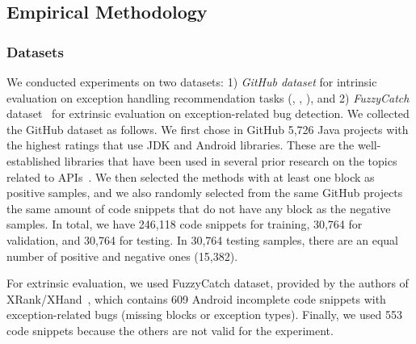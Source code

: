 \vspace{-6pt}
\subsection{Empirical Methodology}

\subsubsection{Datasets}


We conducted experiments on two datasets: 1) {\em GitHub dataset}
for intrinsic evaluation on exception handling recommendation tasks
({\xblock}, {\xstate}, {\xtype}), and 2) {\em FuzzyCatch}
dataset~\cite{xrank-fse20} for extrinsic evaluation on
exception-related bug detection.
%
%
We collected the GitHub dataset as follows. We first chose in GitHub
5,726 Java projects with the highest ratings that use
JDK and Android libraries.
These are the well-established libraries that have been used in
several prior research on the topics related to
APIs~\cite{icse18,liveapi14}.
%
We then selected the methods with at least one  block
as positive samples, and we also randomly selected from the same
GitHub projects the same amount of code snippets that do not have any
 block as the negative samples. In total, we have 246,118
code snippets for training, 30,764 for validation, and 30,764 for
testing. In 30,764 testing samples, there are an equal number of
positive and negative ones (15,382).




For extrinsic evaluation, we used FuzzyCatch dataset, provided by the
authors of XRank/XHand~\cite{xrank-fse20}, which contains 609 Android
incomplete code snippets with exception-related bugs (missing
 blocks or exception types). Finally, we used 553 code snippets
because the others are not valid for the experiment.

